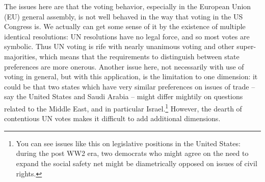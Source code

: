 The issues here are that the voting behavior, especially in the European Union (EU) general assembly, is not well behaved in the way that voting in the US Congress is. We actually can get some sense of it by the existence of multiple identical resolutions: UN resolutions have no legal force, and so most votes are symbolic. Thus UN voting is rife with nearly unanimous voting and other super-majorities, which means that the requirements to distinguish between state preferences are more onerous. Another issue here, not necessarily with use of voting in general, but with this application, is the limitation to one dimension: it could be that two states which have very similar preferences on issues of trade -- say the United States and Saudi Arabia -- might differ mightily on questions related to the Middle East, and in particular Israel.\footnote{You can see issues like this on legislative positions in the United States: during the post WW2 era, two democrats who might agree on the need to expand the social safety net might be diametrically opposed on issues of civil rights.} However, the dearth of contentious UN votes makes it difficult to add additional dimensions.
